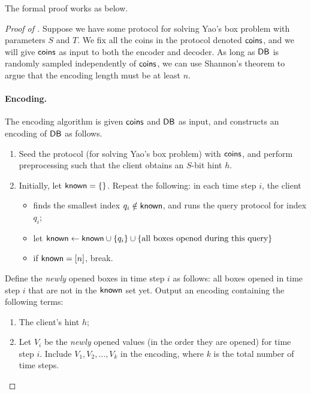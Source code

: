 The formal proof works as below.

\begin{proof}[Proof of ]
Suppose we have some protocol for solving Yao's box problem 
with parameters $S$ and $T$. 
We fix all the coins in the protocol denoted ${\sf coins}$,
and we will give ${\sf coins}$ as input to 
both the encoder and decoder. 
As long as ${\sf DB}$ is randomly sampled independently of ${\sf coins}$,
we can use Shannon's theorem to argue
that the encoding length must be at least $n$.

\paragraph{Encoding.}
The encoding algorithm is given ${\sf coins}$ and ${\sf DB}$ as input,
and constructs an encoding of ${\sf DB}$ as follows.

    \begin{enumerate}[leftmargin=6mm]
        \item Seed the protocol (for solving Yao's box problem) 
with ${\sf coins}$, and 
perform preprocessing
such that the client obtains an $S$-bit hint $h$.
        \item 
Initially, let ${\sf known} = \{\}$. 
Repeat the following: 
in each time step $i$, the client 
\begin{itemize}[leftmargin=5mm]
\item finds the smallest 
index $q_i \notin {\sf known}$, and 
runs the query protocol for index $q_i$; 
\item 
let ${\sf known} \leftarrow {\sf known} 
\cup \{q_i\} \cup \{\text{all boxes opened during this query}\}$
\item if ${\sf known} = [n]$, break. %
\end{itemize}
    \end{enumerate}

Define the {\it newly} opened boxes in 
time step $i$ as follows: 
all boxes opened in time step $i$ that are not in the ${\sf known}$ 
set yet. 
Output an encoding containing the following terms:
\begin{enumerate}[leftmargin=6mm]
\item 
The client's hint $h$;
\item 
Let $V_i$ be the {\it newly} opened values  
(in the order they are opened)
for time step $i$.
Include $V_1, V_2, \ldots, V_k$ 
in the encoding, where $k$ 
is the total number of time steps.
\end{enumerate}


\end{proof}
